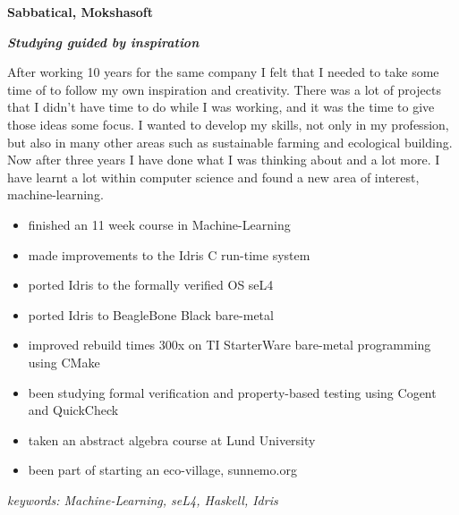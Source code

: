 \item[2016-] \textbf{Sabbatical, Mokshasoft}

\textit{\textbf{Studying guided by inspiration}}

After working 10 years for the same company I felt that I needed to take some time of to follow my own inspiration and creativity. There was a lot of projects that I didn't have time to do while I was working, and it was the time to give those ideas some focus. I wanted to develop my skills, not only in my profession, but also in many other areas such as sustainable farming and ecological building. Now after three years I have done what I was thinking about and a lot more. I have learnt a lot within computer science and found a new area of interest, machine-learning.

\begin{itemize}
    \item finished an 11 week course in Machine-Learning
    \item made improvements to the Idris C run-time system
    \item ported Idris to the formally verified OS seL4
    \item ported Idris to BeagleBone Black bare-metal
    \item improved rebuild times 300x on TI StarterWare bare-metal programming using CMake
    \item been studying formal verification and property-based testing using Cogent and QuickCheck
    \item taken an abstract algebra course at Lund University
    \item been part of starting an eco-village, sunnemo.org
\end{itemize}

\textit{keywords: Machine-Learning, seL4, Haskell, Idris}
